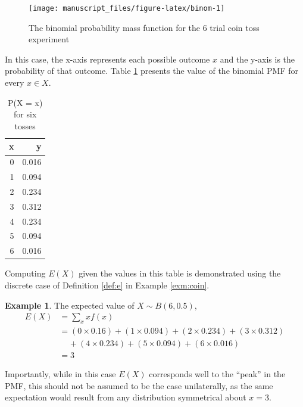 \documentclass[
  12pt,
]{book}
\theoremstyle{definition}
\theoremstyle{definition}
\newtheorem{example}{Example}[chapter]
\theoremstyle{definition}
\theoremstyle{remark}
\begin{document}
\begin{figure}

{\centering \texttt{[image: manuscript\_files/figure-latex/binom-1]} 

}

\caption{The binomial probability mass function for the 6 trial coin toss experiment}\label{fig:binom}
\end{figure}

In this case, the x-axis represents each possible outcome \(x\) and the y-axis is the probability of that outcome. Table \ref{tab:bino} presents the value of the binomial PMF for every \(x \in X\).

\begin{table}[!h]

\caption{\label{tab:bino}P(X = x) for six tosses}
\centering
\begin{tabular}[t]{rr}
\toprule
x & y\\
\midrule
0 & 0.016\\
1 & 0.094\\
2 & 0.234\\
3 & 0.312\\
4 & 0.234\\
5 & 0.094\\
6 & 0.016\\
\bottomrule
\end{tabular}
\end{table}

Computing \(E(X)\) given the values in this table is demonstrated using the discrete case of Definition \ref{def:e} in Example \ref{exm:coin}.

\begin{example}
\protect\hypertarget{exm:coin}{}{\label{exm:coin} }The expected value of \(X \sim B(6, 0.5)\),
\[\begin{split}
E(X) & = \sum_{x}xf(x) \\
  & =  (0 \times 0.16)+(1 \times 0.094)+(2 \times 0.234)+(3 \times 0.312)\\
  & \;\;\;\; +(4 \times 0.234)+(5 \times 0.094)+(6 \times 0.016)\\
  & = 3
\end{split}\]
\end{example}

Importantly, while in this case \(E(X)\) corresponds well to the ``peak'' in the PMF, this should not be assumed to be the case unilaterally, as the same expectation would result from any distribution symmetrical about \(x=3\).
\end{document}
